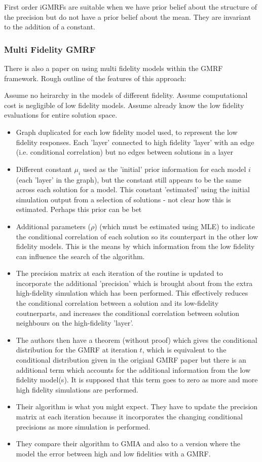 \message{ !name(SO-Methods.tex)}\documentclass{article}
\begin{document}
First order iGMRFs are suitable when we have prior belief about the structure of the precision but do not have a prior belief about the mean. They are invariant to the addition of a constant. 

\subsubsection{Multi Fidelity GMRF}

There is also a paper on using multi fidelity models within the GMRF framework. Rough outline of the features of this approach:

Assume no heirarchy in the models of different fidelity. Assume computational cost is negligible of low fidelity models. Assume already know the low fidelity evaluations for entire solution space.

\begin{itemize}
\item Graph duplicated for each low fidelity model used, to represent the low fidelity responses. Each 'layer' connected to high fidelity 'layer' with an edge (i.e. conditional correlation) but no edges between solutions in a layer 
\item Different constant $\mu_i$ used as the 'initial' prior information for each model $i$ (each 'layer' in the graph), but the constant still appears to be the same across each solution for a model. This constant 'estimated' using the initial simulation output from a selection of solutions - not clear how this is estimated. Perhaps this prior can be bet
\item Additional parameters ($\rho$) (which must be estimated using MLE) to indicate the conditional correlation of each solution so its counterpart in the other low fidelity models. This is the means by which information from the low fidelity can influence the search of the algorithm.
\item The precision matrix at each iteration of the routine is updated to incorporate the additional 'precision' which is brought about from the extra high-fidelity simulation which has been performed. This effectively reduces the conditional correlation between a solution and its low-fidelity coutnerparts, and increases the conditional correlation between solution neighbours on the high-fidelity 'layer'.
\item The authors then have a theorem (without proof) which gives the conditional distribution for the GMRF at iteration $t$, which is equivalent to the conditional distribution given in the origianl GMRF paper but there is an additional term which accounts for the additional information from the low fidelity model(s). It is supposed that this term goes to zero as more and more high fidelity simulations are performed.
\item Their algorithm is what you might expect. They have to update the precision matrix at each iteration because it incorporates the changing conditional precisions as more simulation is performed.
\item They compare their algorithm to GMIA and also to a version where the model the error between high and low fidelities with a GMRF.
\end{itemize}
\end{document}

